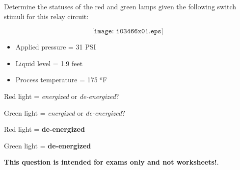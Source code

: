 

Determine the statuses of the red and green lamps given the following switch stimuli for this relay circuit:

$$\texttt{[image: i03466x01.eps]}$$

\begin{itemize}
\item{} Applied pressure = 31 PSI
\item{} Liquid level = 1.9 feet
\item{} Process temperature = 175 $^{o}$F
\end{itemize}

\vskip 10pt

Red light = {\it energized} or {\it de-energized}?

\vskip 10pt

Green light = {\it energized} or {\it de-energized}?







Red light = {\bf de-energized}

Green light = {\bf de-energized}







{\bf This question is intended for exams only and not worksheets!}.


